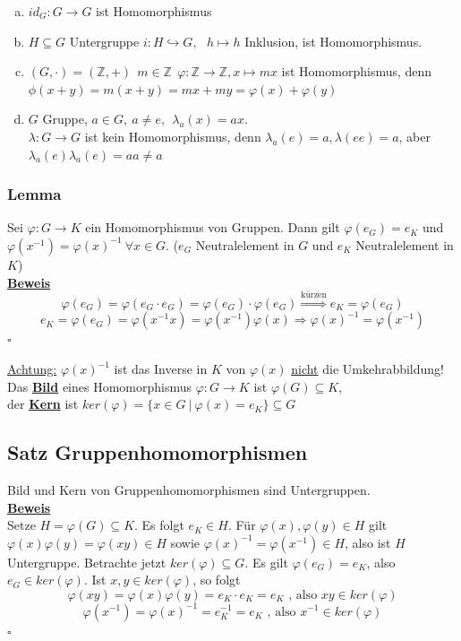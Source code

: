 \documentclass[a4paper, pagesize=pdftex, pdftex, twoside, headsepline, index=totoc,toc=listof, fontsize=10pt, cleardoublepage=empty, headinclude, DIV=13, BCOR=13mm]{scrartcl}
\newcommand{\bet}[1]{\uline{\textbf{#1}}} %
\newcommand{\Index}[1]{\uline{\textbf{#1}}\index{#1}} %
\begin{document}
\begin{enumerate}[(a)]
	\item $id_G: G \to G$ ist Homomorphismus
	\item $H \subseteq G$ Untergruppe   $i:H \hookrightarrow G,~~~h \mapsto h$ Inklusion, ist Homomorphismus.
	\item $(G,\cdot)=(\mathds{Z},+)~~m\in \mathds{Z} ~~ \varphi:\mathds{Z} \to \mathds{Z}, x\mapsto mx$ ist Homomorphismus, denn $\phi(x+y)=m(x+y)=mx+my=\varphi(x)+\varphi(y)$
	\item $G$ Gruppe, $a \in G,~ a\not= e,~~ \lambda_a(x)=ax$.\\
	$\lambda: G \to G$ ist kein Homomorphismus, denn $\lambda_a(e)=a, \lambda(ee)=a$, aber $\lambda_a(e)\lambda_a(e)=aa\not=a$
\end{enumerate}

\subsubsection*{Lemma}
Sei $\varphi:G \to K$ ein Homomorphismus von Gruppen. Dann gilt $\varphi(e_G)=e_K$ und $\varphi(x^{-1})=\varphi(x)^{-1}~\forall x \in G$. ($e_G$ Neutralelement in $G$ und $e_K$ Neutralelement in $K$)\\
\bet{Beweis}\\
\[
	\varphi(e_G)=\varphi(e_G \cdot e_G)=\varphi(e_G) \cdot \varphi(e_G)
	\stackrel{\text{kürzen}}{\Rightarrow} e_K=\varphi(e_G)
\]
\[
	e_K=\varphi(e_G)=\varphi(x^{-1}x)=\varphi(x^{-1})\varphi(x) \Rightarrow \varphi(x)^{-1}=\varphi(x^{-1})
\]
\hfill $\square$

\uline{Achtung:} $\varphi(x)^{-1}$ ist das Inverse in $K$ von $\varphi(x)$ \uline{nicht} die Umkehrabbildung!\\

Das \Index{Bild} eines Homomorphismus $\varphi:G \to K$ ist $\varphi(G)\subseteq K$,\\
der \Index{Kern} ist $ker(\varphi)=\{x \in G~|~\varphi(x)=e_K \}\subseteq G$

\subsection{Satz Gruppenhomomorphismen}
\label{sub:satz_ghm}
Bild und Kern von Gruppenhomomorphismen sind Untergruppen.\\

\bet{Beweis}\\
Setze $H=\varphi(G)\subseteq K$. Es folgt $e_K \in H$. Für $\varphi(x),\varphi(y)\in H$ gilt $\varphi(x)\varphi(y)=\varphi(xy)\in H$ sowie $\varphi(x)^{-1}=\varphi(x^{-1}) \in H$, also ist $H$ Untergruppe. Betrachte jetzt $ker(\varphi)\subseteq G$. Es gilt $\varphi(e_G)=e_K$, also $e_G \in ker(\varphi)$. Ist $x,y \in ker(\varphi)$, so folgt 
\[\varphi(xy)=\varphi(x)\varphi(y)=e_K \cdot e_K=e_K \text{ , also } xy \in ker(\varphi)\]
\[\varphi(x^{-1})=\varphi(x)^{-1}=e_K^{-1}=e_K \text{ , also } x^{-1} \in ker(\varphi) \]
\hfill $\square$
\end{document}
